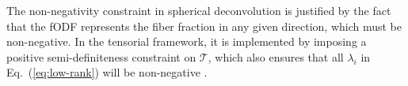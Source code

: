 The non-negativity constraint in spherical deconvolution is justified by
the fact that the fODF represents the fiber fraction in any given
direction, which must be non-negative. In the tensorial framework, it is implemented by imposing a positive semi-definiteness constraint on $\mathcal{T}$, which also ensures that all $\lambda_i$ in Eq.~(\ref{eq:low-rank}) will be non-negative \cite{Ankele:CARS2017}. 


